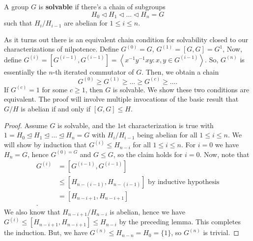 \begin{definition}
	A group \(G\) is \textbf{solvable} if there's a chain  of subgroups \[
	H_0 \triangleleft H_1 \triangleleft \ldots \triangleleft H_{n} = G
	\] such that \(H_{i} / H_{ i -1}\) are abelian for \(1 \le i \le n\).
\end{definition}
As it turns out there is an equivalent chain condition for solvability closed to our characterizations of nilpotence.
Define \(G^{\left( 0 \right) } = G\), \(G^{\left( 1 \right) } = \left[ G, G \right]  = G^{1}\), Now, define \(G^{\left( i \right) } = \left[ G^{\left( i-1 \right) }, G^{\left( i-1 \right) } \right] = \left<x^{-1}y^{-1}xy : x, y \in G^{\left( i-1 \right) } \right>  \). So, \(G^{\left( n \right) }\) is essentially the \(n\)-th iterated commutator of \(G\). Then, we obtain a chain \[
	G^{\left( 0 \right) }\ge G^{\left( 1 \right) } \ge \ldots \ge G^{\left( c \right) } \ge \ldots
.\]
If \(G^{\left( c \right) } = 1\) for some \(c \ge 1\), then \(G\) is solvable. We show these two conditions are equivalent. The proof will involve multiple invocations of the basic result that \(G / H\) is abelian if and only if \(\left[ G, G \right]  \le H\).
\begin{proof}
	Assume \(G\) is solvable, and the \(1\)st characterization is true with \(1 = H_0 \trianglelefteq H_1 \trianglelefteq \ldots \trianglelefteq H_{n} = G\) with \(H_{i} / H_{ i -1}\) being abelian for all \(1 \le i \le n\). We will show by induction that \(G^{\left( i \right) }\le H_{n - i}\) for all \(1\le i \le n\). For \( i = 0\) we have \(H_{n} = G\), hence \(G^{\left( 0 \right) = G}\) and \(G \le G\), so the claim holds for \(i = 0\). Now, note that
	\begin{align*}
		G^{\left( i \right) } &= \left[ G^{\left( i - 1 \right) }, G^{\left( i - 1 \right) } \right] \\
				      &\le \left[ H_{n - \left( i - 1 \right) }, H_{n - \left( i - 1 \right) } \right] \text{ by inductive hypothesis} \\
				      &= \left[ H_{ n - i + 1}, H_{n - i + 1} \right]  \\
	.\end{align*}
	We also know that \(H_{ n - i + 1} / H_{ n - i}\) is abelian, hence we have \(G^{\left( i \right) } \le \left[H_{ n - i + 1}, H_{n - i + 1}  \right] \le H_{n - i} \) by the preceding lemma. This completes the induction. But, we have \(G^{\left( n \right) }\le H_{n - n } = H_0 = \{1\} \), so \(G^{\left( n \right) }\) is trivial.
\end{proof}
